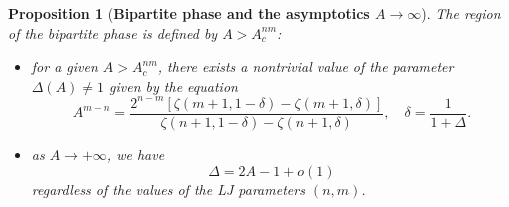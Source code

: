 \documentclass[12pt]{iopart}
\newtheorem{prop}[thm]{Proposition}
\theoremstyle{definition}
\begin{document}
\begin{prop}[\textbf{Bipartite phase and the asymptotics $A\to\infty$}]
The region of the bipartite phase is defined by $A>A_c^{nm}$:  
\begin{itemize}
\item[(1)]
for a given $A>A_c^{nm}$, there exists a nontrivial value of the parameter
$\Delta(A)\ne 1$ given by the equation
\begin{equation} \label{adel}
A^{m-n}=\frac{2^{n-m}[\zeta(m+1,1-\delta)-\zeta(m+1,\delta)]}{
\zeta(n+1,1-\delta)-\zeta(n+1,\delta)},\quad \delta=\frac{1}{1+\Delta}.
\end{equation}
\item[(2)] as $A\to +\infty$, we have
\begin{equation} \label{deltaas}
\Delta = 2A - 1 + o(1)
\end{equation}
regardless of the values of the LJ parameters $(n,m)$.
\end{itemize}
\end{prop}
\end{document}
